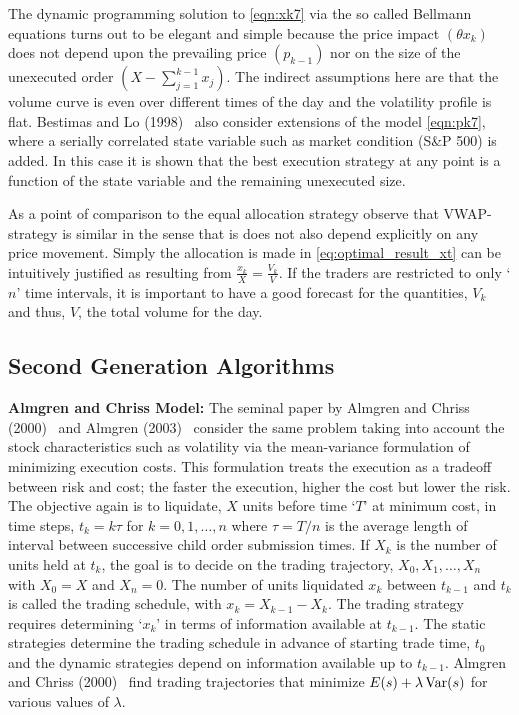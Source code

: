 The dynamic programming solution to \eqref{eqn:xk7} via the so called Bellmann equations turns out to be elegant and simple because the price impact $(\theta x_k)$ does not depend upon the prevailing price $(p_{k-1})$ nor on the size of the unexecuted order $(X - \sum_{j=1}^{k-1} x_j)$. The indirect assumptions here are that the volume curve is even over different times of the day and the volatility profile is flat. Bestimas and Lo (1998)~\cite{berlo} also consider extensions of the model \eqref{eqn:pk7}, where a serially correlated state variable such as market condition (S\&P 500) is added. In this case it is shown that the best execution strategy at any point is a function of the state variable and the remaining unexecuted size. 


As a point of comparison to the equal allocation strategy observe that VWAP-strategy is similar in the sense that is does not also depend explicitly on any price movement. Simply the allocation is made in \eqref{eq:optimal_result_xt} can be intuitively justified as resulting from $\frac{x_k}{X}= \frac{V_k}{V}$. If the traders are restricted to only `$n$' time intervals, it is important to have a good forecast for the quantities, $V_k$ and thus, $V$, the total volume for the day. 



\subsection{Second Generation Algorithms \label{subsec:almchrmodel}}


\noindent\textbf{Almgren and Chriss Model:} The seminal paper by Almgren and Chriss (2000)~\cite{alm2000} and Almgren (2003)~\cite{almgren2003} consider the same problem taking into account the stock characteristics such as volatility via the mean-variance formulation of minimizing execution costs. This formulation treats the execution as a tradeoff between risk and cost; the faster the execution, higher the cost but lower the risk. The objective again is to liquidate, $X$ units before time `$T$' at minimum cost, in time steps, $t_k = k \tau$ for $k = 0,1,\ldots, n$ where $\tau = T/n$ is the average length of interval between successive child order submission times. If $X_k$ is the number of units held at $t_k$, the goal is to decide on the trading trajectory, $X_0, X_1, \ldots, X_n$ with $X_0=X$ and $X_n=0$. The number of units liquidated $x_k$ between $t_{k-1}$ and $t_k$ is called the trading schedule, with $x_k = X_{k-1} - X_k$. The trading strategy requires determining `$x_k$' in terms of information available at $t_{k-1}$. The static strategies determine the trading schedule in advance of starting trade time, $t_0$ and the dynamic strategies depend on information available up to $t_{k-1}$. Almgren and Chriss (2000)~\cite{alm2000} find trading trajectories that minimize $E(s)+\lambda \operatorname{Var}(s)$ for various values of $\lambda$.


